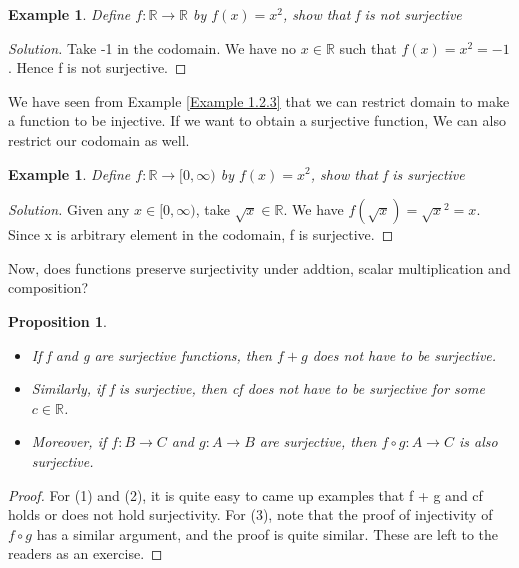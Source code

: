 \documentclass{book}
\newtheorem{example}[theorem]{Example}
\newtheorem{proposition}[theorem]{Proposition}
\begin{document}
\begin{example}
    Define $f : \mathbb{R} \rightarrow \mathbb{R}$ by $f(x) = x^{2}$, show that f is not surjective
\end{example}

\begin{proof}[Solution]
    Take -1 in the codomain. We have no $x \in \mathbb{R}$ such that $f(x) = x^{2} = -1$. Hence f is not surjective.
\end{proof}

We have seen from Example \ref{Example 1.2.3} that we can restrict domain to make a function to be injective. If we want to obtain a surjective function, We can also restrict our codomain as well.

\begin{example}
    Define $f : \mathbb{R} \rightarrow [0, \infty)$ by $f(x) = x^{2}$, show that f is surjective
\end{example}

\begin{proof}[Solution]
    Given any $x \in [0, \infty)$, take $\sqrt{x} \in \mathbb{R}$. We have $f(\sqrt{x}) = \sqrt{x}^{2} = x$. Since x is arbitrary element in the codomain, f is surjective.
\end{proof}

Now, does functions preserve surjectivity under addtion, scalar multiplication and composition?

\begin{proposition}
    \begin{itemize}[itemsep = 0pt]
        \item[(1)] If f and g are surjective functions, then $f + g$ does not have to be surjective.
        \item[(2)] Similarly, if f is surjective, then cf does not have to be surjective for some $c \in \mathbb{R}$.
        \item[(3)] Moreover, if $f : B \rightarrow C$ and $g : A \rightarrow B$ are surjective, then $f \circ g : A \rightarrow C$ is also surjective.
    \end{itemize}
\end{proposition}
\begin{proof}
    For (1) and (2), it is quite easy to came up examples that f + g and cf holds or does not hold surjectivity. For (3), note that the proof of injectivity of $f \circ g$ has a similar argument, and the proof is quite similar. These are left to the readers as an exercise.
\end{proof}
\end{document}
